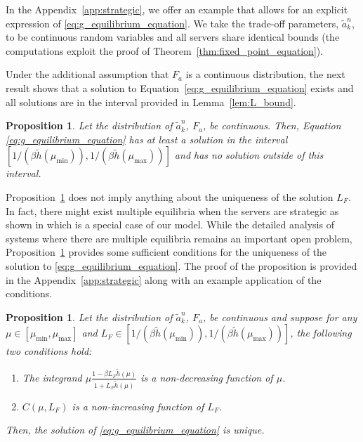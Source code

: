 \documentclass[a4paper,11pt,twoside]{article}
\numberwithin{equation}{section}
\numberwithin{figure}{section}
\theoremstyle{plain}
\newtheorem{proposition}[theorem]{Proposition}
\newcommand{\1}{\mathbbm{1}}
\begin{document}
In the Appendix~\ref{app:strategic}, we offer an example that allows for an explicit expression of \eqref{eq:g_equilibrium_equation}. We take the trade-off parameters, $\tilde{a}_k^n$, to be continuous random variables and all servers share identical bounds (the computations exploit the proof of Theorem~\ref{thm:fixed_point_equation}). 

Under the additional assumption that $F_{a}$ is a continuous distribution, the next result shows that a solution to Equation~\eqref{eq:g_equilibrium_equation} exists and all solutions are in the interval provided in Lemma~\ref{lem:L_bound}.

\begin{proposition}\label{prop:existence}
Let the distribution of $\tilde{a}_k^n$, $F_a$, be continuous. 
Then, Equation \eqref{eq:g_equilibrium_equation} has at least a solution in the interval $[1/(\beta \tilde{h}(\mu_{\min})),1/(\beta \tilde{h}(\mu_{\max}))]$ and has no solution outside of this interval.
\end{proposition}

Proposition~\ref{prop:existence} does not imply anything about the uniqueness of the solution $L_F$. In fact, there might exist multiple equilibria when the servers are strategic as shown in \cite{gopalakrishnan2021} which is a special case of our model.  While the detailed analysis of systems where there are multiple equilibria remains an important open problem, Proposition~\ref{prop:uniqueness} provides some sufficient conditions for the uniqueness of the solution to \eqref{eq:g_equilibrium_equation}. The proof of the proposition is provided in the Appendix~\ref{app:strategic} along with an example application of the conditions.

\begin{proposition}
    \label{prop:uniqueness}
    Let the distribution of $\tilde{a}_k^n$, $F_a$, be continuous and suppose for any $\mu\in [\mu_{\min},\mu_{\max}]$ and $L_F\in [1/(\beta \tilde{h}(\mu_{\min})),1/(\beta \tilde{h}(\mu_{\max}))]$, the following two conditions hold:
    \begin{enumerate}
        \item The integrand $\mu\frac{1-\beta L_F\tilde{h}(\mu)}{1+L_F\tilde{h}(\mu)}$ is a non-decreasing function of $\mu$.
        \item $C(\mu,L_F)$ is a non-increasing function of $L_F$.
    \end{enumerate}
    Then, the solution of \eqref{eq:g_equilibrium_equation} is unique. 
\end{proposition}
\end{document}
